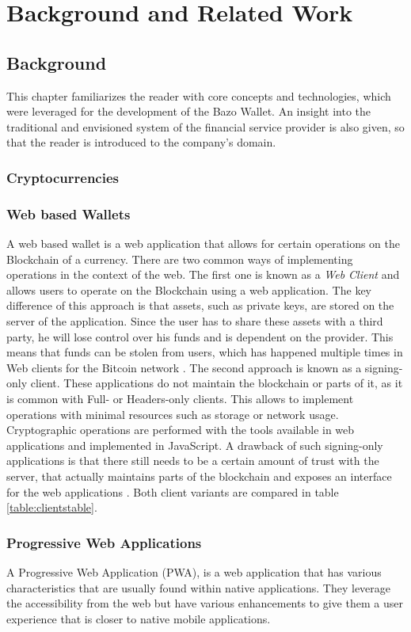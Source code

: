 \chapter{Background and Related Work}
\section{Background}
This chapter familiarizes the reader with core concepts and technologies, which were leveraged for the development of the Bazo Wallet. An insight into the traditional and envisioned system of the financial service provider is also given, so that the reader is introduced to the company's domain.
\subsection{Cryptocurrencies}
\subsection{Web based Wallets}
A web based wallet is a web application that allows for certain operations on the Blockchain of a currency. There are two common ways of implementing operations in the context of the web.
The first one is known as a \textit{Web Client} and allows users to operate on the Blockchain using a web application. The key difference of this approach is that assets, such as private keys, are stored on the server of the application. Since the user has to share these assets with a third party, he will lose control over his funds and is dependent on the provider. This means that funds can be stolen from users, which has happened multiple times in Web clients for the Bitcoin network \cite{masteringbitcoin}.
The second approach is known as a signing-only client. These applications do not maintain the blockchain or parts of it, as it is common with Full- or Headers-only clients. This allows to implement operations with minimal resources such as storage or network usage. Cryptographic operations are performed with the tools available in web applications and implemented in JavaScript.
A drawback of such signing-only applications is that there still needs to be a certain amount of trust with the server, that actually maintains parts of the blockchain and exposes an interface for the web applications \cite{bitcoinclients}.
Both client variants are compared in table \ref{table:clientstable}.
\subsection{Progressive Web Applications}\label{pwacharacteristics}
A Progressive Web Application (PWA), is a web application that has various characteristics that are usually found within native applications.
They leverage the accessibility from the web but have various enhancements to give them a user experience that is closer to native mobile applications.

